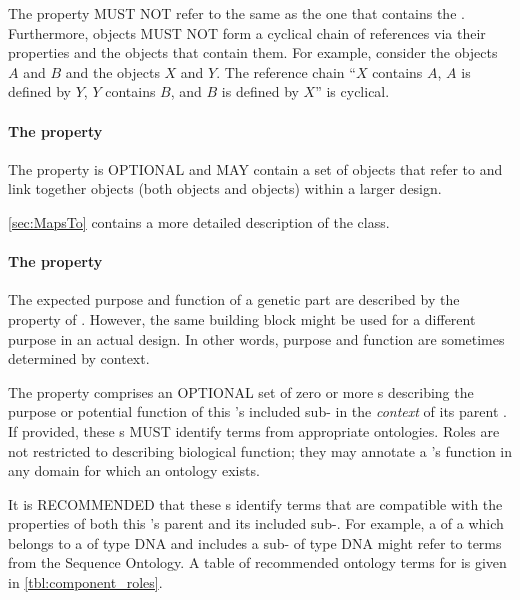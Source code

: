 The  property MUST NOT refer to the same  as the one that contains the .
Furthermore,  objects MUST NOT form a cyclical chain of references via their  properties and the  objects that contain them.
For example, consider the  objects $A$ and $B$ and the  objects $X$ and $Y$. The reference chain ``$X$ contains $A$, $A$ is defined by $Y$, $Y$ contains $B$, and $B$ is defined by $X$'' is cyclical.

\paragraph{The  property}\label{sec:mapsTos:CI}

The  property is OPTIONAL and MAY contain a set of  objects that refer to and link together  objects (both  objects and  objects) within a larger design.

\ref{sec:MapsTo} contains a more detailed description of the  class.


\paragraph{The  property}\label{sec:roles:C}

The expected purpose and function of a genetic part are described by the
 property of . However, the same building block might be used for a different purpose in an actual design. In other words, purpose and function are sometimes determined by context. 

The  property comprises an OPTIONAL set of zero or more  s describing the purpose or potential function of this 's included sub- in the \textit{context} of its parent .
If provided, these  s MUST identify terms from appropriate ontologies. Roles are not restricted to describing biological function; they may annotate a 's function in any domain for which an ontology exists.

It is RECOMMENDED that these  s identify terms that are compatible with the  properties of both this 's parent  and its included sub-. For example, a  of a  which belongs to a  of type DNA and includes a sub- of type DNA might refer to terms from the Sequence Ontology. A table of recommended ontology terms for  is given in \ref{tbl:component_roles}.



